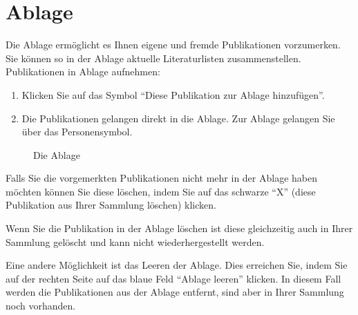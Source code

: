 \section{Ablage}
\label{sec:ablage}
Die Ablage ermöglicht es Ihnen eigene und fremde Publikationen vorzumerken. Sie können so in der Ablage aktuelle Literaturlisten zusammenstellen.
\newline
Publikationen in Ablage aufnehmen: %
\begin{enumerate}
    \item Klicken Sie auf das Symbol \enquote{Diese Publikation zur Ablage hinzufügen}.
    \item Die Publikationen gelangen direkt in die Ablage. Zur Ablage gelangen Sie über das Personensymbol.
\end{enumerate}
\begin{figure}[h!]
 \centering
 \caption{Die Ablage}
 \label{fig:ablage}
\end{figure} 
Falls Sie die vorgemerkten Publikationen nicht mehr in der Ablage haben möchten können Sie diese löschen, indem Sie auf das schwarze \enquote{X} (diese Publikation aus Ihrer Sammlung löschen) klicken.\newline
\begin{tip}Wenn Sie die Publikation in der Ablage löschen ist diese gleichzeitig auch in Ihrer Sammlung gelöscht und kann nicht wiederhergestellt werden.
\end{tip}

Eine andere Möglichkeit ist das Leeren der Ablage. Dies erreichen Sie, indem Sie auf der rechten Seite auf das blaue Feld \enquote{Ablage leeren} klicken. In diesem Fall werden die Publikationen aus der Ablage entfernt, sind aber in Ihrer Sammlung noch vorhanden.
